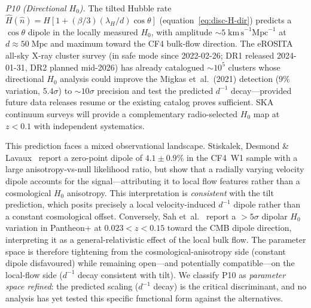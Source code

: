 \emph{P10 (Directional $H_0$).}
The tilted Hubble rate
$\hat{H}(\hat{n}) = H[1 + (\beta/3)(\lambda_H/d)\cos\theta]$
(equation~\eqref{eq:disc-H-dir}) predicts a $\cos\theta$
dipole in the locally measured $H_0$, with amplitude
$\sim\!5\;\mathrm{km\,s}^{-1}\mathrm{Mpc}^{-1}$ at
$d \approx 50\;\mathrm{Mpc}$ and maximum toward the CF4
bulk-flow direction.  The eROSITA all-sky X-ray cluster survey
(in safe mode since 2022-02-26; DR1 released 2024-01-31, DR2
planned mid-2026) has already catalogued $\sim\!10^5$ clusters
whose directional $H_0$ analysis could improve the Migkas
et~al.\ (2021) detection ($9\%$ variation, $5.4\sigma$) to
$\sim\!10\sigma$ precision and test the predicted $d^{-1}$
decay---provided future data releases resume or the existing
catalog proves sufficient.  SKA continuum surveys will provide
a complementary radio-selected $H_0$ map at $z < 0.1$ with
independent systematics.

This prediction faces a mixed observational landscape.
Stiskalek, Desmond \& Lavaux~\cite{Stiskalek2026} report a
zero-point dipole of $4.1 \pm 0.9\%$ in the CF4~W1 sample
with a large anisotropy-vs-null likelihood ratio, but show
that a radially varying velocity dipole accounts for the
signal---attributing it to local flow features rather than a
cosmological $H_0$ anisotropy.  This interpretation is
\emph{consistent} with the tilt prediction, which posits
precisely a local velocity-induced $d^{-1}$ dipole rather
than a constant cosmological offset.  Conversely,
Sah et~al.~\cite{Sah2025} report a $> 5\sigma$ dipolar
$H_0$ variation in Pantheon+ at $0.023 < z < 0.15$ toward
the CMB dipole direction, interpreting it as a
general-relativistic effect of the local bulk flow.  The
parameter space is therefore tightening from the
cosmological-anisotropy side (constant dipole disfavoured)
while remaining open---and potentially
compatible---on the local-flow side ($d^{-1}$ decay
consistent with tilt).
We classify P10 as \emph{parameter space refined}: the
predicted scaling ($d^{-1}$ decay) is the critical
discriminant, and no analysis has yet tested this specific
functional form against the alternatives.

